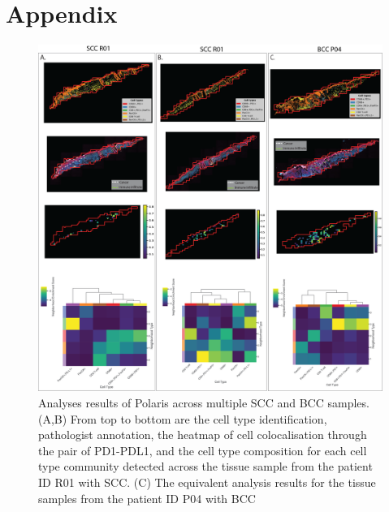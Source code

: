\section{Appendix}
\begin{figure}[htp]
\renewcommand{\figurename}{Supplementary Figure}
    \centering
    \includegraphics[width=0.75\columnwidth]{Chapter3/Figures/Chap3_supple_figure_1.png}
    \caption[Analyses results of Polaris across multiple SCC and BCC samples]{Analyses results of Polaris across multiple SCC and BCC samples. (A,B) From top to bottom are the cell type identification, pathologist annotation, the heatmap of cell colocalisation through the pair of PD1-PDL1, and the cell type composition for each cell type community detected across the tissue sample from the patient ID R01 with SCC. (C) The equivalent analysis results for the tissue samples from the patient ID P04 with BCC}
    \label{fig:Chap2_Supfigure7}
\end{figure}
% 

% 


